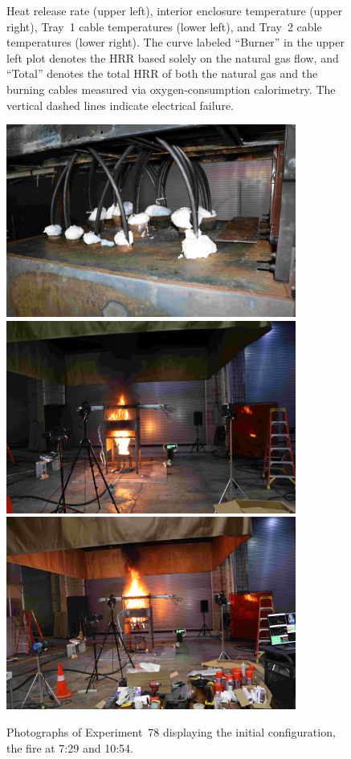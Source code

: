 \begin{figure}[H]
\caption[HRR and temperatures of Experiment 78]{Heat release rate (upper left), interior enclosure temperature (upper right), Tray~1 cable temperatures (lower left), and Tray~2 cable temperatures (lower right). The curve labeled ``Burner'' in the upper left plot denotes the HRR based solely on the natural gas flow, and ``Total'' denotes the total HRR of both the natural gas and the burning cables measured via oxygen-consumption calorimetry. The vertical dashed lines indicate electrical failure.}
\label{fig:Test_78}
\end{figure}

\begin{figure}[p]
\centering
\includegraphics[height=2.50in]{../FIGURES/Test_78_Photo_1} \\ \vspace{0.1in}
\includegraphics[height=2.50in]{../FIGURES/Test_78_Photo_2} \\ \vspace{0.1in}
\includegraphics[height=2.50in]{../FIGURES/Test_78_Photo_3}
\caption[Photographs of Experiment~78]{Photographs of Experiment~78 displaying the initial configuration, the fire at 7:29 and 10:54.}
\label{fig:Test_78_photos}
\end{figure}


